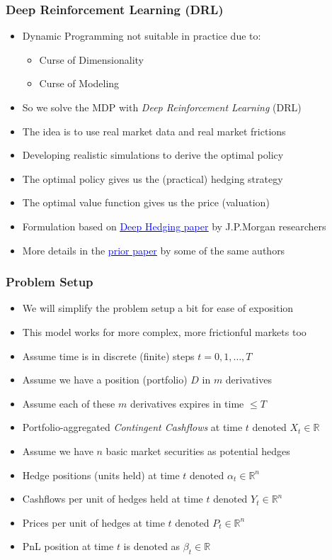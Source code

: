 \documentclass{beamer}
\begin{document}
\begin{frame}
\frametitle{Deep Reinforcement Learning (DRL)}
\begin{itemize}
\item Dynamic Programming not suitable in practice due to:
\begin{itemize}
\item Curse of Dimensionality
\item Curse of Modeling
\end{itemize}
\item So we solve the MDP with {\em Deep Reinforcement Learning} (DRL)
\item The idea is to use real market data and real market frictions
\item Developing realistic simulations to derive the optimal policy
\item The optimal policy gives us the (practical) hedging strategy
\item The optimal value function gives us the price (valuation)
\item Formulation based on \href{https://papers.ssrn.com/sol3/papers.cfm?abstract_id=3355706}{\underline{\textcolor{blue}{Deep Hedging paper}}} by J.P.Morgan researchers
\item More details in the \href{https://papers.ssrn.com/sol3/papers.cfm?abstract_id=3355706}{\underline{\textcolor{blue}{prior paper}}} by some of the same authors
\end{itemize}
\end{frame}

\begin{frame}
\frametitle{Problem Setup}
\begin{itemize}
\item We will simplify the problem setup a bit for ease of exposition
\item This model works for more complex, more frictionful markets too
\item Assume time is in discrete (finite) steps $t = 0, 1, \ldots, T$
\item Assume we have a position (portfolio) $D$ in $m$ derivatives
\item Assume each of these $m$ derivatives expires in time $ \leq T$
\item Portfolio-aggregated {\em Contingent Cashflows} at time $t$ denoted $X_t \in \mathbb{R}$
\item Assume we have $n$ basic market securities as potential hedges
\item Hedge positions (units held) at time $t$ denoted $\alpha_t \in \mathbb{R}^n$
\item Cashflows per unit of hedges held at time $t$ denoted $Y_t \in \mathbb{R}^n$
\item Prices per unit of hedges at time $t$ denoted $P_t \in \mathbb{R}^n$
\item PnL position at time $t$ is denoted as $\beta_t \in \mathbb{R}$
\end{itemize}
\end{frame}
\end{document}

